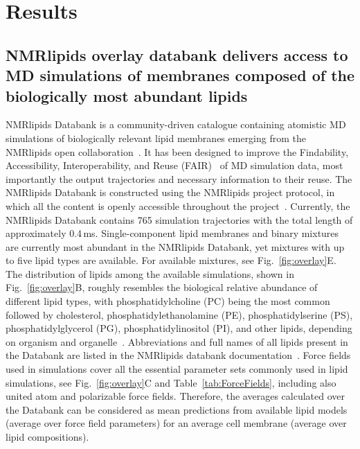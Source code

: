 \documentclass[fleqn,10pt]{wlscirep}
\begin{document}
\section{Results}

\subsection{NMRlipids overlay databank delivers access to MD simulations of membranes composed of the biologically most abundant lipids}

NMRlipids Databank is a community-driven catalogue containing atomistic MD simulations of biologically relevant lipid membranes emerging from the NMRlipids open collaboration~\cite{botan15,ollila16,catte16,antila19,bacle21}. It has been designed to improve the Findability, Accessibility, Interoperability, and Reuse (FAIR)~\cite{wilkinson16} of MD simulation data, most importantly the output trajectories and necessary information to their reuse. The NMRlipids Databank is constructed using the NMRlipids project protocol, in which all the content is openly accessible throughout the project~\cite{botan15}. Currently, the NMRlipids Databank contains 765 simulation trajectories with the total length of approximately 0.4\,ms. Single-component lipid membranes and binary mixtures are currently most abundant in the NMRlipids Databank, yet mixtures with up to five lipid types are available. For available mixtures, see Fig.~\ref{fig:overlay}E. The distribution of lipids among the available simulations, shown in Fig.~\ref{fig:overlay}B, roughly resembles the biological relative abundance of different lipid types, with phosphatidylcholine (PC) being the most common followed by cholesterol, phosphatidylethanolamine (PE), phosphatidylserine (PS), phosphatidylglycerol (PG), phosphatidylinositol (PI), and other lipids, depending on organism and organelle~\cite{vanmeer08}. Abbreviations and full names of all lipids present in the Databank are listed in the NMRlipids databank documentation~\cite{NMRlipidsDocsMolAndMapping}. %
Force fields used in simulations cover all the essential parameter sets commonly used in lipid simulations, see Fig.~\ref{fig:overlay}C and Table~\ref{tab:ForceFields}, including also united atom and polarizable force fields. Therefore, the averages calculated over the Databank can be considered as mean predictions from available lipid models (average over force field parameters) for an average cell membrane (average over lipid compositions).
\end{document}
